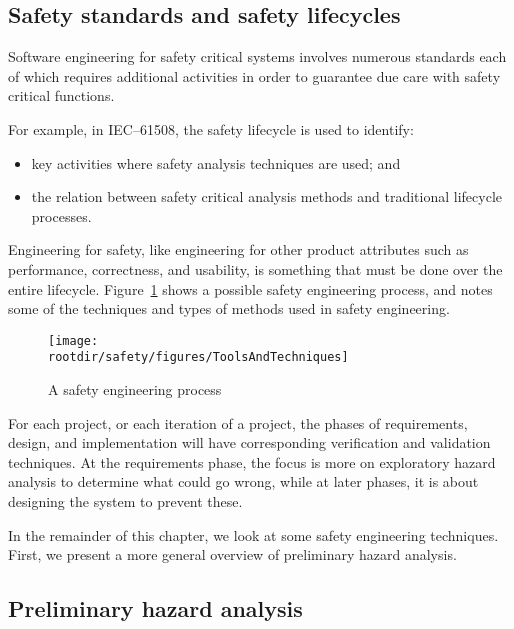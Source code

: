 \subsection{Safety standards and safety lifecycles}


  Software engineering for safety critical systems involves numerous
  standards each of which requires additional activities in order to
  guarantee due care with safety critical functions.

  For example, in IEC--61508, the safety lifecycle is used to
  identify:
  \begin{itemize}

  \item key activities where safety analysis techniques are used; and
    
  \item the relation between safety critical analysis methods and
    traditional lifecycle processes.
    
  \end{itemize}


 Engineering for safety, like engineering for other product attributes such as performance, correctness, and usability, is something that must be done over the entire lifecycle. Figure~\ref{fig:safety:ToolsAndTechniques} shows a possible safety engineering process, and notes some of the techniques and types of methods used in safety engineering.

  \begin{figure}[!h]
   \centering
    \texttt{[image: \\rootdir/safety/figures/ToolsAndTechniques]}
    \caption{A safety engineering process}
   \label{fig:safety:ToolsAndTechniques} 
  \end{figure}
  
 For each project, or each iteration of a project, the phases of requirements, design, and implementation will have corresponding verification and validation techniques. At the requirements phase, the focus is more on exploratory hazard analysis to determine what could go wrong, while at later phases, it is about designing the system to prevent these.

  In the remainder of this chapter, we look at some safety engineering techniques. First, we present a more general overview of preliminary hazard analysis.



  \subsection{Preliminary hazard analysis}

